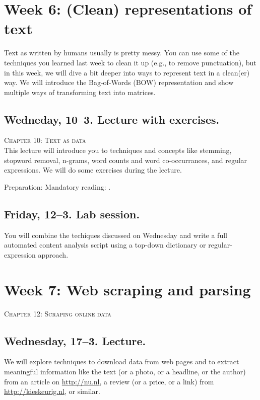 \section*{Week 6: (Clean) representations of text}
Text as written by humans usually is pretty messy. You can use some of the techniques you learned last week to clean it up (e.g., to remove punctuation), but in this week, we will dive a bit deeper into ways to represent text in a clean(er) way. We will introduce the Bag-of-Words (BOW) representation and show multiple ways of transforming text into matrices.



\subsection*{Wedneday, 10--3. Lecture with exercises.}
\textsc{ Chapter 10: Text as data}\\
This lecture will introduce you to techniques and concepts like stemming, stopword removal, n-grams, word counts and word co-occurrances, and regular expressions. We will do some exercises during the lecture.

Preparation: Mandatory reading: \cite{Boumans2016}.


\subsection*{Friday, 12--3. Lab session.}
You will combine the techiques discussed on Wednesday and write a full automated content analysis script using a top-down dictionary or regular-expression approach.





\section*{Week 7: Web scraping and parsing}
\textsc{ Chapter 12: Scraping online data}\\

\subsection*{Wednesday, 17--3. Lecture.}
We will explore techniques to download data from web pages and to extract meaningful information like the text (or a photo, or a headline, or the author) from an article on \url{http://nu.nl}, a review (or a price, or a link) from \url{http://kieskeurig.nl}, or similar.

